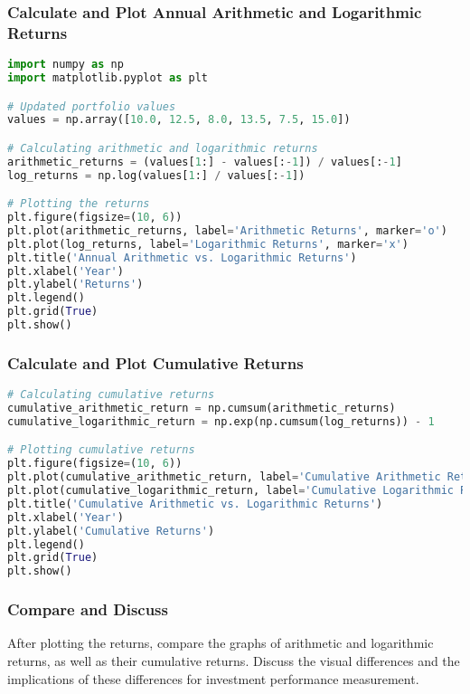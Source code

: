\documentclass{article}
\begin{document}
\subsubsection{Calculate and Plot Annual Arithmetic and Logarithmic Returns}

\begin{lstlisting}[language=Python]
import numpy as np
import matplotlib.pyplot as plt

# Updated portfolio values
values = np.array([10.0, 12.5, 8.0, 13.5, 7.5, 15.0])

# Calculating arithmetic and logarithmic returns
arithmetic_returns = (values[1:] - values[:-1]) / values[:-1]
log_returns = np.log(values[1:] / values[:-1])

# Plotting the returns
plt.figure(figsize=(10, 6))
plt.plot(arithmetic_returns, label='Arithmetic Returns', marker='o')
plt.plot(log_returns, label='Logarithmic Returns', marker='x')
plt.title('Annual Arithmetic vs. Logarithmic Returns')
plt.xlabel('Year')
plt.ylabel('Returns')
plt.legend()
plt.grid(True)
plt.show()
\end{lstlisting}

\subsubsection{Calculate and Plot Cumulative Returns}

\begin{lstlisting}[language=Python]
# Calculating cumulative returns
cumulative_arithmetic_return = np.cumsum(arithmetic_returns)
cumulative_logarithmic_return = np.exp(np.cumsum(log_returns)) - 1

# Plotting cumulative returns
plt.figure(figsize=(10, 6))
plt.plot(cumulative_arithmetic_return, label='Cumulative Arithmetic Returns', marker='o')
plt.plot(cumulative_logarithmic_return, label='Cumulative Logarithmic Returns', marker='x')
plt.title('Cumulative Arithmetic vs. Logarithmic Returns')
plt.xlabel('Year')
plt.ylabel('Cumulative Returns')
plt.legend()
plt.grid(True)
plt.show()
\end{lstlisting}

\subsubsection{Compare and Discuss}

After plotting the returns, compare the graphs of arithmetic and logarithmic returns, as well as their cumulative returns. Discuss the visual differences and the implications of these differences for investment performance measurement.
\end{document}
